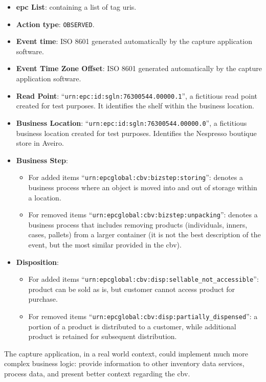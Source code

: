 \begin{itemize}
  \item \textbf{\ac{epc} List}: containing a list of tag \acp{uri}.
  \item \textbf{Action type}: \texttt{OBSERVED}.
  \item \textbf{Event time}: ISO 8601 generated automatically by the capture application software.
  \item \textbf{Event Time Zone Offset}: ISO 8601 generated automatically by the capture application software.
  \item \textbf{Read Point}: ``\texttt{urn:epc:id:sgln:76300544.00000.1}'', a fictitious read point created for test purposes. It identifies the shelf within the business location.
  \item \textbf{Business Location}: ``\texttt{urn:epc:id:sgln:76300544.00000.0}'', a fictitious business location created for test purposes. Identifies the Nespresso boutique store in Aveiro. 
  \item \textbf{Business Step}:
    \begin{itemize}
      \item For added items ``\texttt{urn:epcglobal:cbv:bizstep:storing}'': denotes a business process where an object is moved into and out of storage within a location.
      \item For removed items ``\texttt{urn:epcglobal:cbv:bizstep:unpacking}'': denotes a business process that includes removing products (individuals, inners, cases, pallets) from a larger container (it is not the best description of the event, but the most similar provided in the \ac{cbv}).
    \end{itemize}
  \item \textbf{Disposition}:
    \begin{itemize}
      \item For added items ``\texttt{urn:epcglobal:cbv:disp:sellable\_not\_accessible}'': product can be sold as is, but customer cannot access product for purchase.
      \item For removed items ``\texttt{urn:epcglobal:cbv:disp:partially\_dispensed}'': a portion of a product is distributed to a customer, while additional product is retained for subsequent distribution.
    \end{itemize}
\end{itemize}

The capture application, in a real world context, could implement much more complex business logic: provide information to other inventory data services, process data, and present better context regarding the \ac{cbv}. 

